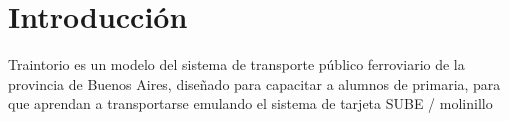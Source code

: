 \documentclass[../main.tex]{subfiles}
\begin{document}
\graphicspath{{../images/}}
\section{Introducción}
Traintorio es un modelo
del sistema de transporte público ferroviario de la provincia de Buenos Aires,
diseñado para capacitar a alumnos de primaria, para que aprendan a transportarse
emulando el sistema de tarjeta SUBE / molinillo
\end{document}
